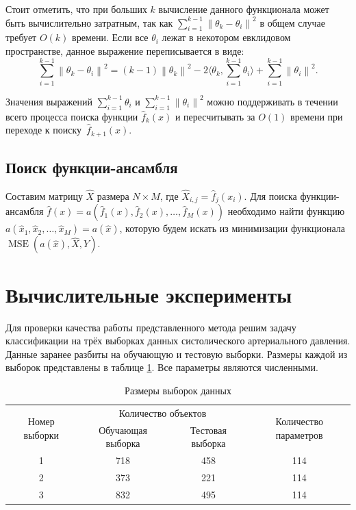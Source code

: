 \documentclass[12pt, fleqn]{article}
\newcommand{\norm}[1]{\left\lVert#1\right\rVert}
\newcommand{\mse}{\mathop{MSE}}
\newcommand{\scalarproduct}[1]{\langle #1 \rangle}
\newcommand{\predictionfunction}{\hat{f}}
\newcommand{\ensemblefunction}{a}
\newcommand{\objects}{X}
\newcommand{\results}{Y}
\newcommand{\predictedobjects}{\widehat{\objects}}
\newcommand{\numberobjects}{N}
\newcommand{\numberpredictionfunctions}{M}
\newcommand{\for}[3]{\sum\limits_{#1 = #2}^{#3}}  %
\newcommand{\forn}[2]{\for{#1}{1}{#2}}  %
\newcommand{\many}[3]{#1 1 #2, #1 2 #2, \dots, #1 #3 #2}  %
\newcommand{\ensemblefunctionfull}{\ensemblefunction(\many{\predictionfunction_}{(x)}{\numberpredictionfunctions})}
\begin{document}
Стоит отметить, что при больших $k$ вычисление данного функционала может быть вычислительно затратным, так как $\forn{i}{k - 1}\norm{\theta_k - \theta_i}^2$ в общем случае требует $O(k)$ времени. Если все $\theta_i$ лежат в некотором евклидовом пространстве, данное выражение переписывается в виде:
$$
\forn{i}{k - 1}\norm{\theta_k - \theta_i}^2 = (k - 1)\norm{\theta_k}^2 - 2\scalarproduct{\theta_k, \forn{i}{k - 1} \theta_i} + \forn{i}{k - 1}\norm{\theta_i}^2.
$$

Значения выражений $\forn{i}{k - 1} \theta_i$ и $\forn{i}{k - 1}\norm{\theta_i}^2$ можно поддерживать в течении всего процесса поиска функции $\predictionfunction_k(x)$ и пересчитывать за $O(1)$ времени при переходе к поиску~$\predictionfunction_{k+1}(x)$.

\subsection{Поиск функции-ансамбля}

Составим матрицу $\predictedobjects$ размера $\numberobjects \times \numberpredictionfunctions$, где $\predictedobjects_{i, j} = \predictionfunction_j(x_i)$.
Для поиска функции-ансамбля $\predictionfunction(x) = \ensemblefunctionfull$ необходимо найти функцию $\ensemblefunction(\many{\hat{x}_}{}{\numberpredictionfunctions}) = \ensemblefunction(\hat{x})$, которую будем искать
из минимизации функционала $\mse(\ensemblefunction(\hat{x}), \predictedobjects, \results)$.

\section{Вычислительные эксперименты}

Для проверки качества работы представленного метода решим задачу классификации на трёх выборках данных систолического артериального давления. Данные заранее разбиты на обучающую и тестовую выборки. Размеры каждой из выборок представлены в таблице \ref{tabular:datasize}. Все параметры являются численными.

\begin{table}[h!]
	\begin{center}
		\begin{tabular}{|c|c|c|c|}
			\hline
			\multirow{2}{*}{Номер выборки} & \multicolumn{2}{c|}{Количество объектов} & \multirow{2}{*}{Количество параметров} \\
			\cline{2-3}
			& Обучающая выборка & Тестовая выборка & \\
			\hline
			1 & 718 & 458 & 114 \\
			\hline
			2 & 373 & 221 & 114 \\
			\hline
			3 & 832 & 495 & 114 \\
			\hline
		\end{tabular}
	\end{center}
	
	\caption{Размеры выборок данных}
	\label{tabular:datasize}
\end{table}
\end{document}
